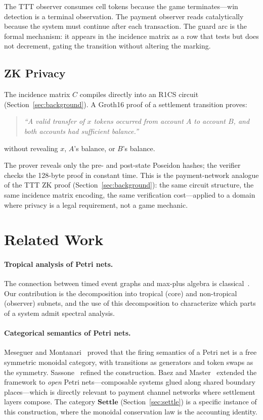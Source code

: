 \documentclass[11pt,a4paper]{article}
\newcommand{\Settle}{\mathbf{Settle}}
\begin{document}
The TTT observer consumes cell tokens because the game terminates---win detection is a terminal observation.
The payment observer reads catalytically because the system must continue after each transaction.
The guard arc is the formal mechanism: it appears in the incidence matrix as a row that tests but does not decrement, gating the transition without altering the marking.

\subsection{ZK Privacy}

The incidence matrix $C$ compiles directly into an R1CS circuit (Section~\ref{sec:background}).
A Groth16 proof of a settlement transition proves:
\begin{quote}
\emph{``A valid transfer of $x$ tokens occurred from account $A$ to account $B$, and both accounts had sufficient balance.''}
\end{quote}
without revealing $x$, $A$'s balance, or $B$'s balance.

The prover reveals only the pre- and post-state Poseidon hashes; the verifier checks the 128-byte proof in constant time.
This is the payment-network analogue of the TTT ZK proof (Section~\ref{sec:background}): the same circuit structure, the same incidence matrix encoding, the same verification cost---applied to a domain where privacy is a legal requirement, not a game mechanic.

\section{Related Work}
\label{sec:related}

\paragraph{Tropical analysis of Petri nets.}
The connection between timed event graphs and max-plus algebra is classical~\cite{baccelli1992,gaubert1999}.
Our contribution is the decomposition into tropical (core) and non-tropical (observer) subnets, and the use of this decomposition to characterize which parts of a system admit spectral analysis.

\paragraph{Categorical semantics of Petri nets.}
Meseguer and Montanari~\cite{meseguer1990} proved that the firing semantics of a Petri net is a free symmetric monoidal category, with transitions as generators and token swaps as the symmetry.
Sassone~\cite{sassone1995} refined the construction.
Baez and Master~\cite{baez2020} extended the framework to \emph{open} Petri nets---composable systems glued along shared boundary places---which is directly relevant to payment channel networks where settlement layers compose.
The category $\Settle$ (Section~\ref{sec:settle}) is a specific instance of this construction, where the monoidal conservation law is the accounting identity.
\end{document}
